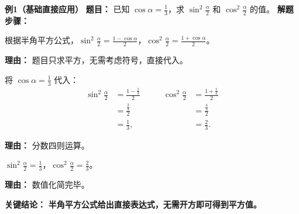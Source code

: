 \begin{examplebox}
	\textbf{\textcolor{CExample}{例1（基础直接应用）}}
	\textbf{\textcolor{CExample}{题目：}}
	已知 $\cos\alpha = \frac{1}{3}$，求 $\sin^2\frac{\alpha}{2}$ 和 $\cos^2\frac{\alpha}{2}$ 的值。
	\textbf{\textcolor{CExample}{解题步骤：}}
	\begin{description}[style=nextline, leftmargin=2.8em, labelsep=0.5em, itemsep=0.45em]
		\item[\textbf{第一步（套用平方公式）：}]
			根据半角平方公式，$\sin^2\frac{\alpha}{2} = \frac{1-\cos\alpha}{2}$，$\cos^2\frac{\alpha}{2} = \frac{1+\cos\alpha}{2}$。
			\par\textbf{理由：} 题目只求平方，无需考虑符号，直接代入。
		\item[\textbf{第二步（代入数值）：}]
			将 $\cos\alpha = \frac{1}{3}$ 代入：
			\[
				\begin{aligned}
					\sin^2\frac{\alpha}{2} &= \frac{1-\frac{1}{3}}{2} \\ &= \frac{\frac{2}{3}}{2} \\ &= \frac{1}{3},
			\end{aligned}
				\qquad
				\begin{aligned}
					\cos^2\frac{\alpha}{2} &= \frac{1+\frac{1}{3}}{2} \\ &= \frac{\frac{4}{3}}{2} \\ &= \frac{2}{3}.
			\end{aligned}
			\]
			\par\textbf{理由：} 分数四则运算。
		\item[\textbf{第三步（写出结果）：}]
			$\sin^2\frac{\alpha}{2} = \frac{1}{3}$，$\cos^2\frac{\alpha}{2} = \frac{2}{3}$。
			\par\textbf{理由：} 数值化简完毕。
	\end{description}
	\textbf{\textcolor{CExample}{关键结论：}}
	\textbf{半角平方公式给出直接表达式，无需开方即可得到平方值。}


\end{examplebox}
